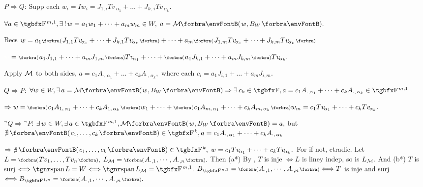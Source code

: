 $P\Rightarrow Q:$\,\;Supp each $w_i=Iw_i=J_{1,i}Tv_{\:\!\!\alpha_1}+\dots+J_{k,\,i}Tv_{\:\!\!\alpha_k}.$\par\quad\Hb
$\forall a\in\FbbP{m,1},\exists\,!\,w=a_1w_1+\dots+a_mw_m\in W,\;a=\Mt{w,B_W}.$\par\quad\Hb
{}Becs $w=a_1\BigPar{J_{1,1}Tv_{\:\!\!\alpha_1}+\dots+J_{k,1}Tv_{\:\!\!\alpha_k}}+\dots+a_m\BigPar{J_{1,m}Tv_{\:\!\!\alpha_1}+\dots+J_{k,m}Tv_{\:\!\!\alpha_k}}$\par\vspace{2pt}\quad\Hb
{} $\Blind{w}=\BigPar{a_1J_{1,1}+\dots+a_mJ_{1,m}}Tv_{\:\!\!\alpha_1}+\dots+\BigPar{a_1J_{k,1}+\dots+a_mJ_{k,m}}Tv_{\:\!\!\alpha_k}.$\par\vspace{2pt}\quad\Hb
{}Apply $\mathcal{M}$ to both sides, $a=c_1A_{\cdot,\,\alpha_1}+\dots+c_kA_{\cdot,\,\alpha_k},$ where each $c_i=a_1J_{i,1}+\dots+a_mJ_{i,m}.$\par\vspace{6pt}\quad\Hb
$Q\Rightarrow P:$\,\;$\forall w\in W,\exists\,\!\,a=\Mt{w,B_W}\Rightarrow\exists\,c_k\in\Fbb,a=c_1A_{\cdot,{\alpha_1}}+\dots+c_kA_{\cdot,\,\alpha_k}\in\FbbP{m,1}$\par\quad\Hb
{}$\Rightarrow w=\BigPar{c_1A_{1,\,{\alpha_1}}+\dots+c_kA_{1,\,{\alpha_k}}}w_1+\dots+\BigPar{c_1A_{m,\,{\alpha_1}}+\dots+c_kA_{m,\,{\alpha_k}}}w_m=c_1Tv_{\:\!\!\alpha_1}+\dots+c_kTv_{\:\!\!\alpha_k}.$\vspace{6pt}\par\quad\Hb
${}{^\neg}Q\Rightarrow{}{^\neg}P:$\,\;$\exists\,w\in W,\exists\,a\in\FbbP{m,1},\Mt{w,B_W}=a,$ but $\nexists\,\Par{c_1,\dots,c_k}\in\FbbP{k},a=c_1A_{\cdot,\,\alpha_1}+\dots+c_kA_{\cdot,\,\alpha_k}$\par\quad\Hb
{}$\Rightarrow\nexists\,\Par{c_1,\dots,c_k}\in\FbbP{k},\;w=c_1Tv_{\:\!\!\alpha_1}+\dots+c_kTv_{\:\!\!\alpha_k}.$ For if not, ctradic.\PfEnd\vspace{6pt}
\ANote Let $L=\BigPar{Tv_1,\dots,Tv_n},\;L_{\mM}=\BigPar{A_{\cdot,1},\cdots,A_{\cdot,n}}.$\parNot
Then (a*) By , $T$ is inje $\Longleftrightarrow L$ is liney indep, so is $L_{\mathcal{M}}$.\parNot
And (b*) $T$ is surj $\Longleftrightarrow\spn L=W\Longleftrightarrow\spn L_{\mM}=\FbbP{m,1}.$\parNot
\ACoro $B_{\FbbP{n,1}}=\BigPar{A_{\cdot,1},\cdots,A_{\cdot,n}}\Longleftrightarrow T$ is inje and surj $\Longleftrightarrow B_{\FbbP{1,n}}=\BigPar{A_{\cdot,1},\cdots,A_{\cdot,n}}.$\parNot
